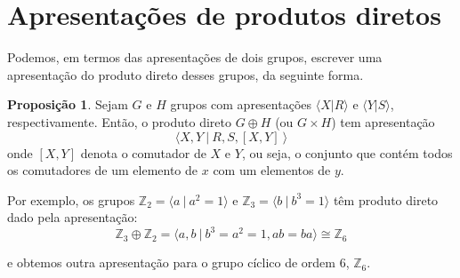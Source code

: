 \documentclass[a4paper,portuguese,11pt,twoside, leqno]{book}
\theoremstyle{definition}
\newtheorem{prop}{Proposição}[section]
\begin{document}
	\section{Apresentações de produtos diretos}
	\hspace{12pt} Podemos, em termos das apresentações de dois grupos, escrever uma apresentação do produto direto desses grupos, da seguinte forma.
	\begin{prop}
	\label{apresentacao prod direto}
	Sejam $G$ e $H$ grupos com apresentações $\langle X|R \rangle$ e $\langle Y|S \rangle$, respectivamente. Então, o produto direto $G\oplus H$ (ou $G\times H$) tem apresentação
	$$ \langle X,Y \ | \ R,S, [X,Y] \ \rangle $$
	onde $[X,Y]$ denota o comutador de $X$ e $Y$, ou seja, o conjunto que contém todos os comutadores de um elemento de $x$ com um elementos de $y$.
	\end{prop}
	\par\vspace{0.3cm} Por exemplo, os grupos $\mathbb{Z}_2 = \langle a\ | \ a^2=1 \rangle$ e $\mathbb{Z}_3 = \langle b\ | \ b^3=1 \rangle$ têm produto direto dado pela apresentação:
	\begin{equation*}
	\mathbb{Z}_3\oplus\mathbb{Z}_2 = \langle a,b \ | \ b^3=a^2=1, ab = ba \rangle \cong \mathbb{Z}_6 
	\end{equation*}
	\par\vspace{0.3cm} e obtemos outra apresentação para o grupo cíclico de ordem $6$, $\mathbb{Z}_6$.
	
	
\end{document}
